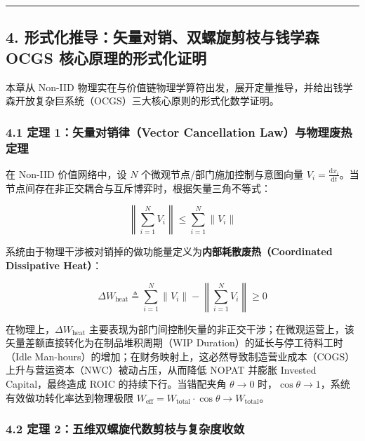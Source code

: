 \documentclass[
]{article}
\begin{document}
\begin{center}\rule{0.5\linewidth}{0.5pt}\end{center}

\subsection{4. 形式化推导：矢量对销、双螺旋剪枝与钱学森 OCGS
核心原理的形式化证明}\label{ux5f62ux5f0fux5316ux63a8ux5bfcux77e2ux91cfux5bf9ux9500ux53ccux87baux65cbux526aux679dux4e0eux94b1ux5b66ux68ee-ocgs-ux6838ux5fc3ux539fux7406ux7684ux5f62ux5f0fux5316ux8bc1ux660e}

本章从 Non-IID
物理实在与价值链物理学算符出发，展开定量推导，并给出钱学森开放复杂巨系统（OCGS）三大核心原则的形式化数学证明。

\subsubsection{4.1 定理 1：矢量对销律（Vector Cancellation
Law）与物理废热定理}\label{ux5b9aux7406-1ux77e2ux91cfux5bf9ux9500ux5f8bvector-cancellation-lawux4e0eux7269ux7406ux5e9fux70edux5b9aux7406}

在 Non-IID 价值网络中，设 \(N\) 个微观节点/部门施加控制与意图向量
\(V_i = \frac{\mathrm{d}x_i}{\mathrm{d}t}\)。当节点间存在非正交耦合与互斥博弈时，根据矢量三角不等式：

\[\left\|\sum_{i=1}^{N} V_i\right\| \le \sum_{i=1}^{N} \|V_i\|\]

系统由于物理干涉被对销掉的做功能量定义为\textbf{内部耗散废热（Coordinated
Dissipative Heat）}：

\[\Delta W_{\text{heat}} \triangleq \sum_{i=1}^{N} \|V_i\| - \left\|\sum_{i=1}^{N} V_i\right\| \ge 0\]

在物理上，\(\Delta W_{\text{heat}}\)
主要表现为部门间控制矢量的非正交干涉；在微观运营上，该矢量差额直接转化为在制品堆积周期（WIP
Duration）的延长与停工待料工时（Idle
Man-hours）的增加；在财务映射上，这必然导致制造营业成本（COGS）上升与营运资本（NWC）被动占压，从而降低
NOPAT 并膨胀 Invested Capital，最终造成 ROIC 的持续下行。当错配夹角
\(\theta \to 0\)
时，\(\cos\theta \to 1\)，系统有效做功转化率达到物理极限
\(W_{\mathrm{eff}} = W_{\mathrm{total}} \cdot \cos\theta \to W_{\mathrm{total}}\)。

\subsubsection{4.2 定理
2：五维双螺旋代数剪枝与复杂度收敛}\label{ux5b9aux7406-2ux4e94ux7ef4ux53ccux87baux65cbux4ee3ux6570ux526aux679dux4e0eux590dux6742ux5ea6ux6536ux655b}
\end{document}
